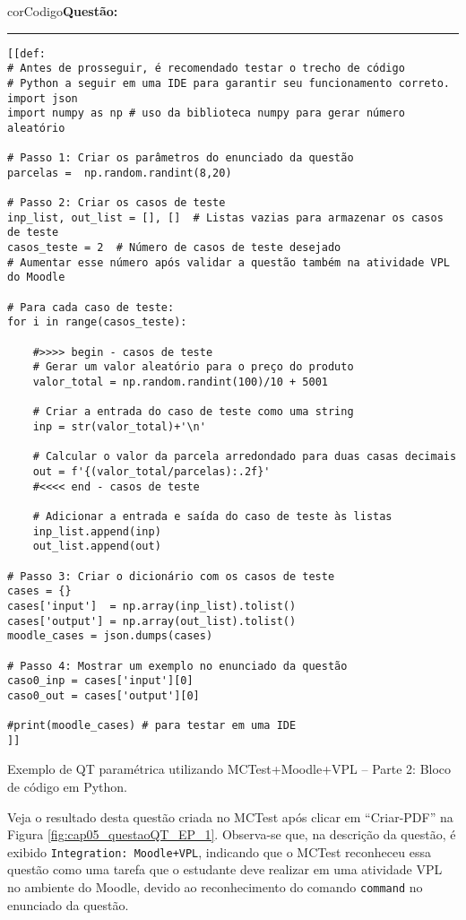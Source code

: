 \begin{listing}[!ht]
\begin{myboxCode}{corCodigo}{\textbf{Questão: } }\vspace{3mm}
\hrule
\begin{verbatim}
[[def: 
# Antes de prosseguir, é recomendado testar o trecho de código  
# Python a seguir em uma IDE para garantir seu funcionamento correto.
import json
import numpy as np # uso da biblioteca numpy para gerar número aleatório 

# Passo 1: Criar os parâmetros do enunciado da questão
parcelas =  np.random.randint(8,20)

# Passo 2: Criar os casos de teste
inp_list, out_list = [], []  # Listas vazias para armazenar os casos de teste
casos_teste = 2  # Número de casos de teste desejado
# Aumentar esse número após validar a questão também na atividade VPL do Moodle

# Para cada caso de teste:
for i in range(casos_teste):    

    #>>>> begin - casos de teste
    # Gerar um valor aleatório para o preço do produto
    valor_total = np.random.randint(100)/10 + 5001 

    # Criar a entrada do caso de teste como uma string
    inp = str(valor_total)+'\n'

    # Calcular o valor da parcela arredondado para duas casas decimais
    out = f'{(valor_total/parcelas):.2f}'
    #<<<< end - casos de teste

    # Adicionar a entrada e saída do caso de teste às listas
    inp_list.append(inp)
    out_list.append(out)

# Passo 3: Criar o dicionário com os casos de teste
cases = {}
cases['input']  = np.array(inp_list).tolist()
cases['output'] = np.array(out_list).tolist()
moodle_cases = json.dumps(cases)

# Passo 4: Mostrar um exemplo no enunciado da questão
caso0_inp = cases['input'][0]
caso0_out = cases['output'][0]

#print(moodle_cases) # para testar em uma IDE
]]
\end{verbatim}
\end{myboxCode}
\caption{Exemplo de QT paramétrica utilizando MCTest+Moodle+VPL -- Parte 2: Bloco de código em Python.}
\label{lst:questaoQT_EP_1_parte2}
\end{listing}

Veja o resultado desta questão criada no MCTest após clicar em ``Criar-PDF'' na Figura \ref{fig:cap05_questaoQT_EP_1}. Observa-se que, na descrição da questão, é exibido \verb|Integration: Moodle+VPL|, indicando que o MCTest reconheceu essa questão como uma tarefa que o estudante deve realizar em uma atividade VPL no ambiente do Moodle, devido ao reconhecimento do comando \verb|command| no enunciado da questão.

